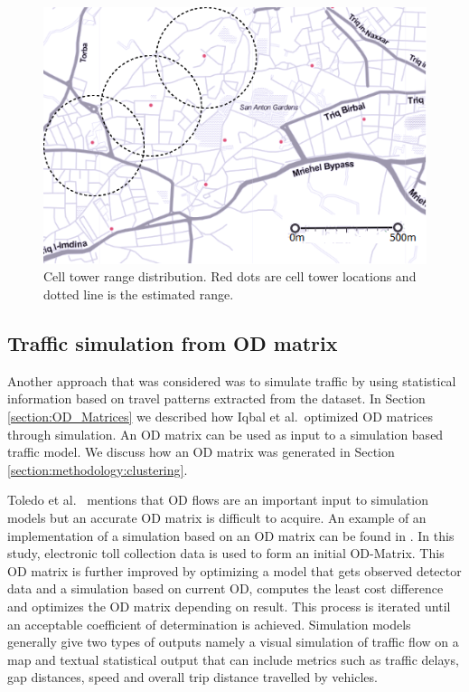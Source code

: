 \documentclass[12pt, a4paper]{report}
\theoremstyle{definition}
\theoremstyle{definition}%
\theoremstyle{definition}%
\theoremstyle{definition}%
\theoremstyle{definition}%
\theoremstyle{definition}%
\begin{document}
\begin{figure}[h]	
	\includegraphics[scale=0.75]{cell_towers_distribution}
	\centering
	\caption[Cell tower distance range]{Cell tower range distribution. Red dots are cell tower locations and dotted line is the estimated range.}
	\label{fig:cell_towers_distribution}
\end{figure}

\subsection{Traffic simulation from OD matrix} \label{subsection:methodology:traffic_simulation_ODMatrix}
Another approach that was considered was to simulate traffic by using statistical information based on travel patterns extracted from the dataset. In Section \ref{section:OD_Matrices} we described how Iqbal et al.\ optimized OD matrices through simulation. An OD matrix can be used as input to a simulation based traffic model. We discuss how an OD matrix was generated in Section \ref{section:methodology:clustering}. 
 
Toledo et al.\ \cite{Toledo2004} mentions that OD flows are an important input to simulation models but an accurate OD matrix is difficult to acquire. An example of an implementation of a simulation based on an OD matrix can be found in \cite{Hirai2015}. In this study, electronic toll collection data is used to form an initial OD-Matrix. This OD matrix is further improved by optimizing a model that gets observed detector data and a simulation based on current OD, computes the least cost difference and optimizes the OD matrix depending on result. This process is iterated until an acceptable coefficient of determination is achieved. Simulation models generally give two types of outputs namely a visual simulation of traffic flow on a map and textual statistical output that can include metrics such as traffic delays, gap distances, speed and overall trip distance travelled by vehicles.
\end{document}
